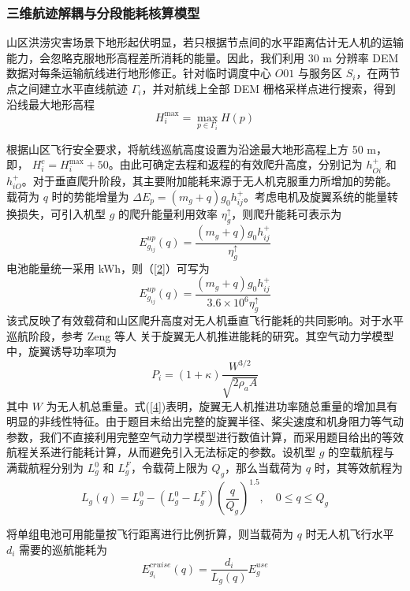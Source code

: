 \subsubsection{三维航迹解耦与分段能耗核算模型}

山区洪涝灾害场景下地形起伏明显，若只根据节点间的水平距离估计无人机的运输能力，会忽略克服地形高程差所消耗的能量。因此，我们利用 30 m 分辨率 DEM 数据对每条运输航线进行地形修正。针对临时调度中心 $O01$ 与服务区 $S_i$，在两节点之间建立水平直线航迹 $\Gamma_i$，并对航线上全部 DEM 栅格采样点进行搜索，得到沿线最大地形高程
\begin{equation}
	H_i^{\max} = \max_{p \in \Gamma_i} H(p)
\end{equation}

根据山区飞行安全要求，将航线巡航高度设置为沿途最大地形高程上方 50 m，即， $H_i^c = H_i^{\max} + 50$。由此可确定去程和返程的有效爬升高度，分别记为 $h_{Oi}^+$ 和 $h_{iO}^+$。对于垂直爬升阶段，其主要附加能耗来源于无人机克服重力所增加的势能。载荷为 $q$ 时的势能增量为 $\Delta E_p = (m_g + q)g_0 h_{ij}^+$。考虑电机及旋翼系统的能量转换损失，可引入机型 $g$ 的爬升能量利用效率 $\eta_g^\uparrow$，则爬升能耗可表示为
\begin{equation}
	E_{g_{ij}}^{up}(q) = \frac{(m_g + q)g_0 h_{ij}^+}{\eta_g^\uparrow}
\end{equation}
电池能量统一采用 kWh，则（\ref{2}）可写为
\begin{equation}
	E_{g_{ij}}^{up}(q) = \frac{(m_g + q)g_0 h_{ij}^+}{3.6 \times 10^6 \eta_g^\uparrow}
\end{equation}
该式反映了有效载荷和山区爬升高度对无人机垂直飞行能耗的共同影响。对于水平巡航阶段，参考 Zeng 等人 \cite{zeng2019energy} 关于旋翼无人机推进能耗的研究。其空气动力学模型中，旋翼诱导功率项为
\begin{equation}
	P_i = (1 + \kappa) \frac{W^{3/2}}{\sqrt{2\rho_a A}}
\end{equation}
其中 $W$ 为无人机总重量。式(\ref{4})表明，旋翼无人机推进功率随总重量的增加具有明显的非线性特征。由于题目未给出完整的旋翼半径、桨尖速度和机身阻力等气动参数，我们不直接利用完整空气动力学模型进行数值计算，而采用题目给出的等效航程关系进行能耗计算，从而避免引入无法标定的参数。设机型 $g$ 的空载航程与满载航程分别为 $L_g^0$ 和 $L_g^F$，令载荷上限为 $Q_g$，那么当载荷为 $q$ 时，其等效航程为
\begin{equation}
	L_g(q) = L_g^0 - (L_g^0 - L_g^F) \left( \frac{q}{Q_g} \right)^{1.5}, \quad 0 \leq q \leq Q_g
\end{equation}

将单组电池可用能量按飞行距离进行比例折算，则当载荷为 $q$ 时无人机飞行水平 $d_i$ 需要的巡航能耗为
\begin{equation}
	E_{g_i}^{cruise}(q) = \frac{d_i}{L_g(q)} E_g^{use}
\end{equation}

